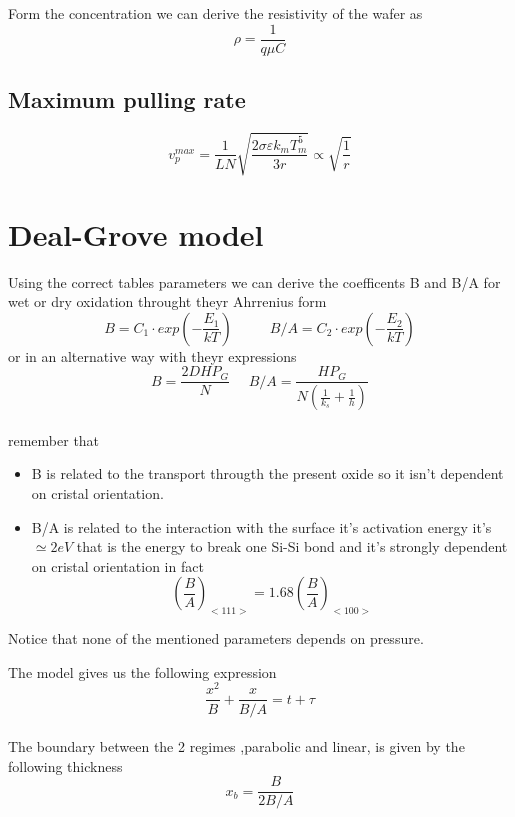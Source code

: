 \vspace{3mm}

Form the concentration we can derive the resistivity of the wafer as
\begin{equation}
\rho=\frac{1}{q\mu C}
\end{equation}

\subsection{Maximum pulling rate}
\begin{equation}
v_p^{max}=\frac{1}{LN}\sqrt{\frac{2\sigma \varepsilon k_m T_m^5}{3r}}\propto \sqrt{\frac{1}{r}}
\end{equation}

\section{Deal-Grove model}
Using the correct tables parameters we can derive the coefficents B and B/A for wet or dry oxidation throught theyr Ahrrenius form 
\begin{equation}
B=C_1\cdot exp\left(-\frac{E_1}{kT} \right) \ \ \ \ \ \ \ \ \ \ \ \ B/A=C_2\cdot exp\left(-\frac{E_2}{kT} \right)
\end{equation}
or in an alternative way with theyr expressions
\begin{equation}
B=\frac{2DHP_G}{N} \ \ \ \ \ \ B/A=\frac{HP_G}{N \left( \frac{1}{k_s}+\frac{1}{h}  \right) }
\end{equation}
\\
remember that 
\begin{itemize}
\item B is related to the transport througth the present oxide so it isn't dependent on cristal orientation.
\item B/A is related to the interaction with the surface it's activation energy it's $\simeq 2eV$ that is the energy to break one Si-Si bond and it's strongly dependent on cristal orientation in fact
\begin{equation}
\left(\frac{B}{A}\right)_{<111>}=1.68\left(\frac{B}{A}\right)_{<100>}
\end{equation}
\end{itemize}
Notice that none of the mentioned parameters depends on pressure.\\

\vspace{5mm}

The model gives us the following expression
\begin{equation}
\frac{x^2}{B}+\frac{x}{B/A}=t+\tau
\end{equation}
\\
The boundary between the 2 regimes ,parabolic and linear, is given by the following thickness
\begin{equation}
x_b=\frac{B}{2B/A}
\end{equation}
\\
\vspace{5mm}

